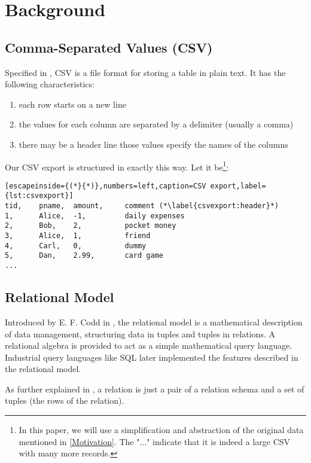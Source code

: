 \newpage
\section{Background}

\subsection{Comma-Separated Values (CSV)}

Specified in \cite{rfc4180}, \gls{CSV} is a file format for storing a table in plain text.
It has the following characteristics:

\begin{enumerate}
    \item each row starts on a new line
    \item the values for each column are separated by a delimiter (usually a comma)
    \item there may be a header line those values specify the names of the columns
\end{enumerate}
Our \gls{CSV} export is structured in exactly this way. Let it be\footnote{
In this paper, we will use a simplification and abstraction of the original
data mentioned in \ref{Motivation}. The "$\dots$" indicate that
it is indeed a large \gls{CSV} with many more records.}:

\begin{lstlisting}[escapeinside={(*}{*)},numbers=left,caption=CSV export,label={lst:csvexport}]
tid,    pname,  amount,     comment (*\label{csvexport:header}*)
1,      Alice,  -1,         daily expenses
2,      Bob,    2,          pocket money
3,      Alice,  1,          friend
4,      Carl,   0,          dummy
5,      Dan,    2.99,       card game
...
\end{lstlisting}

\subsection{Relational Model}

Introduced by E. F. Codd in \cite{Codd70}, the relational model is a mathematical
description of data management, structuring data in tuples and tuples
in relations. A relational algebra is provided to act as a simple
mathematical query language. Industrial query languages
like SQL later implemented the features described in the relational model.

As further explained in \cite{Aren22}, a relation
is just a pair of a relation schema and a set of tuples (the rows of the relation).

